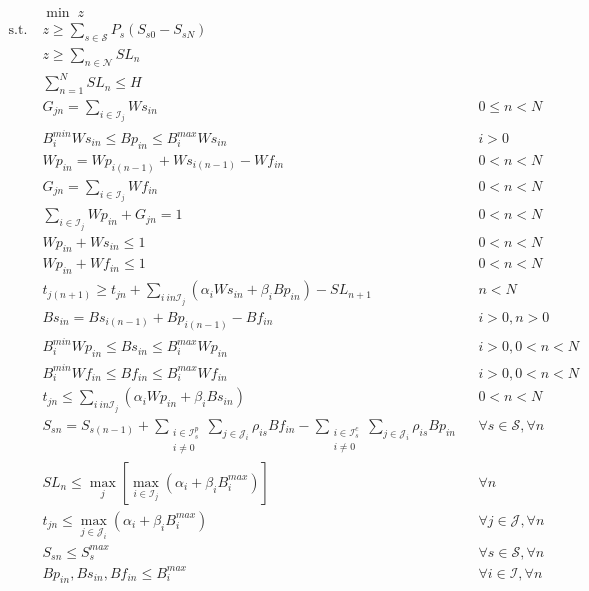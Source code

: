 \begin{align}
&\min \; z &&\\
\text{s.t.}\; &z \ge \sum_{s\in \mathcal{S}} P_s (S_{s0} - S_{sN}) && \\
		  & z \ge \sum_{n\in \mathcal{N}} SL_n  &&\\
		  & \sum_{n=1}^N SL_n \le H &&\\
		  & G_{jn} = \sum_{i \in \mathcal{I}_j} Ws_{in} && 0 \le n < N \\
		  & B_{i}^{min} Ws_{in} \le Bp_{in} \le B_{i}^{max} Ws_{in} && i > 0\\
		  & Wp_{in} = Wp_{i(n-1)} + Ws_{i(n-1)} - Wf_{in} && 0 < n < N \\
		  & G_{jn} = \sum_{i \in \mathcal{I}_j} Wf_{in}  && 0 < n < N \\
		  & \sum_{i \in \mathcal{I}_j} Wp_{in} + G_{jn} = 1 && 0 < n < N \\
		  & Wp_{in}  +Ws_{in} \le 1 && 0 < n < N \\
		  & Wp_{in} + Wf_{in} \le 1 && 0 < n < N \\
		  & t_{j(n+1)} \ge t_{jn} + \sum_{i \ in \mathcal{I}_j} (\alpha_i Ws_{in} + \beta_i Bp_{in}) - SL_{n+1} && n < N \\
		  & Bs_{in} = Bs_{i(n-1)} + Bp_{i(n-1)} - Bf_{in}  && i > 0, n > 0 \\
		  & B_{i}^{min} Wp_{in} \le Bs_{in} \le B_{i}^{max} Wp_{in} && i > 0, 0 < n < N \\
		  & B_{i}^{min} Wf_{in} \le Bf_{in} \le B_{i}^{max} Wf_{in} && i > 0, 0 < n < N \\ 
		  & t_{jn} \le \sum_{i \ in  \mathcal{I}_j} (\alpha_i Wp_{in} + \beta_i Bs_{in})  && 0 < n < N \\
		  & S_{sn} = S_{s(n-1)} + \sum_{\substack{i\in \mathcal{I}_{s}^p\\ i \ne 0}} \sum_{j \in \mathcal{J}_i} \rho_{is} Bf_{in} -   \sum_{\substack{i\in \mathcal{I}_{s}^c\\ i \ne 0}} \sum_{j \in \mathcal{J}_i} \rho_{is} Bp_{in} &&\forall s \in \mathcal{S}, \forall n \\
		  & SL_n \le \max_j \left[\max_{i \in \mathcal{I}_j} (\alpha_i + \beta_i B_{i}^{max}) \right] && \forall n \\
		  & t_{jn} \le \max_{j \in \mathcal{J}_i} (\alpha_i + \beta_i B_{i}^{max}) && \forall j \in \mathcal{J}, \forall n \\
		  & S_{sn} \le S_{s}^{max} && \forall s \in \mathcal{S} , \forall n \\
		  & Bp_{in}, Bs_{in}, Bf_{in} \le B_{i}^{max} && \forall i \in \mathcal{I}, \forall n
\end{align}